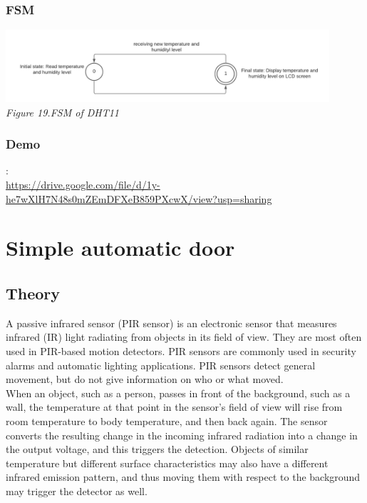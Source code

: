 \documentclass[a4paper]{article}
\begin{document}
\subsubsection{FSM}
\medskip
\begin{center}
    \includegraphics[width=12cm]{pictures/fsm_dht.png}\\
    \textit{Figure 19.FSM of DHT11}\\
\end{center}
\medskip
\subsubsection{Demo}
\text{[Source]}:\\
\url{https://drive.google.com/file/d/1y-he7wXlH7N48s0mZEmDFXeB859PXcwX/view?usp=sharing}

\newpage
\section{Simple automatic door}
\subsection{Theory}
A passive infrared sensor (PIR sensor) is an electronic sensor that measures infrared (IR) light radiating from objects in its field of view. They are most often used in PIR-based motion detectors. PIR sensors are commonly used in security alarms and automatic lighting applications. PIR sensors detect general movement, but do not give information on who or what moved.\bigskip\\
When an object, such as a person, passes in front of the background, such as a wall, the temperature at that point in the sensor's field of view will rise from room temperature to body temperature, and then back again. The sensor converts the resulting change in the incoming infrared radiation into a change in the output voltage, and this triggers the detection. Objects of similar temperature but different surface characteristics may also have a different infrared emission pattern, and thus moving them with respect to the background may trigger the detector as well.
\end{document}
